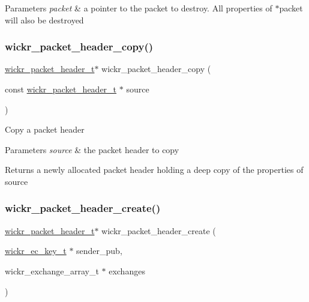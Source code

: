 \begin{DoxyParams}{Parameters}
{\em packet} & a pointer to the packet to destroy. All properties of \textquotesingle{}$\ast$packet\textquotesingle{} will also be destroyed \\
\hline
\end{DoxyParams}
\mbox{\label{group__wickr__protocol_ga5ffb8763c9ebf2ad7322d507d117d7ba}} 
\subsubsection{\texorpdfstring{wickr\+\_\+packet\+\_\+header\+\_\+copy()}{wickr\_packet\_header\_copy()}}
{\footnotesize\ttfamily \mbox{\hyperlink{structwickr__packet__header}{wickr\+\_\+packet\+\_\+header\+\_\+t}}$\ast$ wickr\+\_\+packet\+\_\+header\+\_\+copy (\begin{DoxyParamCaption}\item[{const \mbox{\hyperlink{structwickr__packet__header}{wickr\+\_\+packet\+\_\+header\+\_\+t}} $\ast$}]{source }\end{DoxyParamCaption})}

Copy a packet header


\begin{DoxyParams}{Parameters}
{\em source} & the packet header to copy \\
\hline
\end{DoxyParams}
\begin{DoxyReturn}{Returns}
a newly allocated packet header holding a deep copy of the properties of \textquotesingle{}source\textquotesingle{} 
\end{DoxyReturn}
\mbox{\label{group__wickr__protocol_ga8ad519d1b5dc3960c426db9a556404e1}} 
\subsubsection{\texorpdfstring{wickr\+\_\+packet\+\_\+header\+\_\+create()}{wickr\_packet\_header\_create()}}
{\footnotesize\ttfamily \mbox{\hyperlink{structwickr__packet__header}{wickr\+\_\+packet\+\_\+header\+\_\+t}}$\ast$ wickr\+\_\+packet\+\_\+header\+\_\+create (\begin{DoxyParamCaption}\item[{\mbox{\hyperlink{structwickr__ec__key}{wickr\+\_\+ec\+\_\+key\+\_\+t}} $\ast$}]{sender\+\_\+pub,  }\item[{wickr\+\_\+exchange\+\_\+array\+\_\+t $\ast$}]{exchanges }\end{DoxyParamCaption})}

